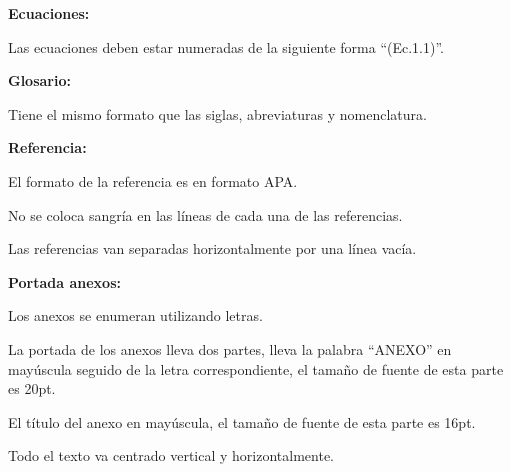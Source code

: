 {{\begin{lista}
    \item\textbf{Ecuaciones:}
    \begin{lista}
        \item Las ecuaciones deben estar numeradas de la siguiente forma “(Ec.1.1)”.
    \end{lista}

    \item \textbf{Glosario:}
    \begin{lista}
        \item Tiene el mismo formato que las siglas, abreviaturas y nomenclatura.
    \end{lista}

    \item\textbf{Referencia:}
    
    \begin{lista}
        \item El formato de la referencia es en formato APA.
        \item No se coloca sangría en las líneas de cada una de las referencias.
        \item Las referencias van separadas horizontalmente por una línea vacía.
    \end{lista}

  

    \item\textbf{Portada anexos:}
    \begin{lista}
        \item Los anexos se enumeran utilizando letras.
        \item La portada de los anexos lleva dos partes, lleva la palabra “ANEXO” en mayúscula seguido de la letra correspondiente, el tamaño de fuente de esta parte es 20pt.
        \item El título del anexo en mayúscula, el tamaño de fuente de esta parte es 16pt.
        \item Todo el texto va centrado vertical y horizontalmente.
    \end{lista}

    \end{lista}
    }
}



